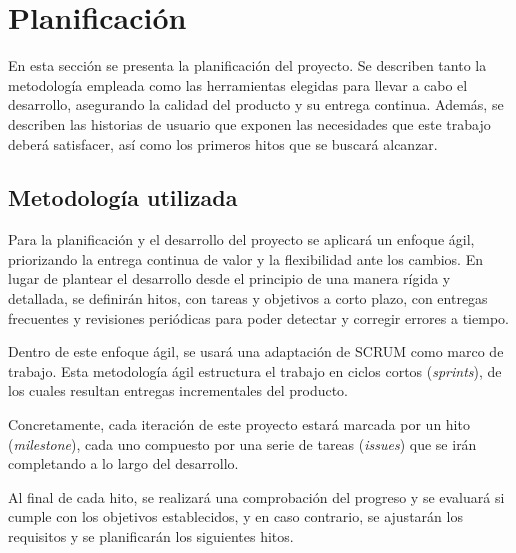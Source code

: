 \chapter{Planificación}
En esta sección se presenta la planificación del proyecto. Se describen tanto la
metodología empleada como las herramientas elegidas para llevar a cabo el desarrollo,
asegurando la calidad del producto y su entrega continua. Además, se describen las historias
de usuario que exponen las necesidades que este trabajo deberá satisfacer, así como los
primeros hitos que se buscará alcanzar.

\section{Metodología utilizada}
Para la planificación y el desarrollo del proyecto se aplicará un enfoque ágil,
priorizando la entrega continua de valor y la flexibilidad ante los cambios.
En lugar de plantear el desarrollo desde el principio de una manera rígida y detallada,
se definirán hitos, con tareas y objetivos a corto plazo, con entregas frecuentes
y revisiones periódicas para poder detectar y corregir errores a tiempo.

Dentro de este enfoque ágil, se usará una adaptación de SCRUM como marco
de trabajo. Esta metodología ágil estructura el trabajo en ciclos cortos (\textit{sprints}),
de los cuales resultan entregas incrementales del producto. 

Concretamente, cada iteración de este proyecto estará marcada por un hito (\textit{milestone}),
cada uno compuesto por una serie de tareas (\textit{issues}) que se irán completando a lo largo
del desarrollo.

Al final de cada hito, se realizará una comprobación del progreso y se evaluará si cumple con los 
objetivos establecidos, y en caso contrario, se ajustarán los requisitos y se planificarán 
los siguientes hitos.

